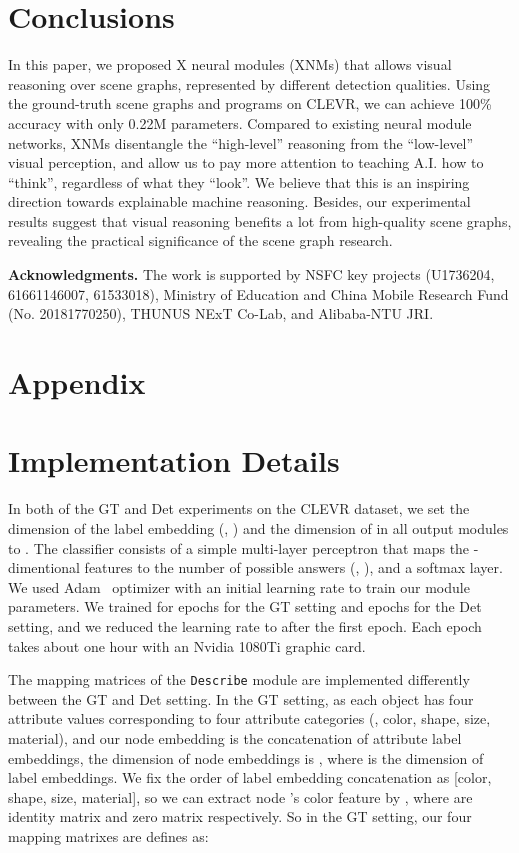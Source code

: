 \documentclass[10pt,twocolumn,letterpaper]{article}
\begin{document}
\section{Conclusions}
In this paper, we proposed X neural modules (XNMs) that allows visual reasoning over scene graphs, represented by different detection qualities.
Using the ground-truth scene graphs and programs on CLEVR, we can achieve 100\% accuracy with only 0.22M parameters. Compared to existing neural module networks, XNMs disentangle the ``high-level'' reasoning from the ``low-level'' visual perception, and allow us to pay more attention to teaching A.I. how to ``think'', regardless of what they ``look''. We believe that this is an inspiring direction towards explainable machine reasoning. Besides, our experimental results suggest that visual reasoning benefits a lot from high-quality scene graphs, revealing the practical significance of the scene graph research.


\textbf{Acknowledgments.}
The work is supported by NSFC key projects (U1736204, 61661146007, 61533018), Ministry of Education and China Mobile Research Fund (No. 20181770250), THUNUS NExT Co-Lab, and Alibaba-NTU JRI.






{\small


}






\newpage
\appendix
\section*{Appendix}
\section{Implementation Details}
In both of the GT and Det experiments on the CLEVR dataset, we set the dimension of the label embedding (\ie, ) and the dimension of  in all output modules to . The classifier consists of a simple multi-layer perceptron that maps the -dimentional features to the number of possible answers (\ie, ), and a softmax layer.
We used Adam~\cite{kingma2014adam} optimizer with an initial learning rate  to train our module parameters. We trained for  epochs for the GT setting and  epochs for the Det setting, and we reduced the learning rate to  after the first epoch. Each epoch takes about one hour with an Nvidia 1080Ti graphic card.

The mapping matrices of the \texttt{Describe} module are implemented differently between the GT and Det setting.
In the GT setting, as each object has four attribute values corresponding to four attribute categories (\ie, color, shape, size, material), and our node embedding is the concatenation of attribute label embeddings, the dimension of node embeddings is , where  is the dimension of label embeddings.
We fix the order of label embedding concatenation as [color, shape, size, material], so we can extract node 's color feature by , where  are  identity matrix and zero matrix respectively.
So in the GT setting, our four mapping matrixes are defines as:
\end{document}
